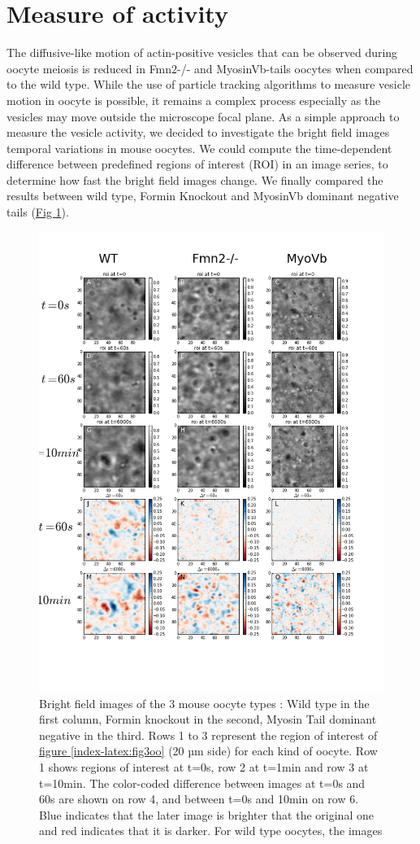 \documentclass[A4paperpaper,11pt,english]{sphinxmanual}
\begin{document}
\section{Measure of activity}
\label{index-latex:measure-of-activity}
The diffusive-like motion of actin-positive vesicles that can be observed during oocyte meiosis is
reduced in Fmn2-/- and MyosinVb-tails oocytes when compared to the wild type.
While the use of particle tracking algorithms to measure vesicle motion in oocyte is possible, it remains a
complex process especially as the vesicles may move outside the microscope focal
plane. As a simple approach to measure the vesicle activity, we decided to
investigate the bright field images temporal variations in mouse oocytes.
We could compute the time-dependent difference between predefined regions of interest (ROI) in an image
series, to determine how fast the bright field images change. We finally compared
the results between wild type, Formin Knockout and MyosinVb dominant negative tails (\hyperref[index-latex:decay-all]{Fig  \ref*{index-latex:decay-all}}).
\begin{figure}[htbp]
\centering
\capstart

\includegraphics[width=0.800\linewidth]{decay-all.png}
\caption{Bright field images of the 3 mouse oocyte types : Wild type in the first column,
Formin knockout in the second, Myosin Tail dominant negative in the third. Rows 1
to 3 represent the region of interest of \hyperref[index-latex:fig3oo]{figure  \ref*{index-latex:fig3oo}} (20 µm side)
for each kind of oocyte. Row 1 shows regions of interest at t=0s, row 2 at
t=1min and row 3 at t=10min. The color-coded difference between images at
t=0s and 60s are shown on row 4, and between t=0s and 10min on row 6. Blue
indicates that the later image is brighter that the original one and red
indicates that it is darker. For wild type oocytes, the images}\label{index-latex:decay-all}\end{figure}
\end{document}
